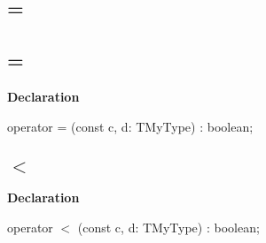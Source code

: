 \documentclass{report}
\newif\ifpdf
\begin{document}
\subsection*{\large{\textbf{=}}\normalsize\hspace{1ex}\hrulefill}
\else
\subsection*{=}
\fi
\label{ok_operator_test-=}
\index{=}
\begin{list}{}{
\setlength{\itemindent}{0cm}
\setlength{\listparindent}{0cm}
\setlength{\leftmargin}{\evensidemargin}
\addtolength{\leftmargin}{\tmplength}
\settowidth{\labelsep}{X}
\addtolength{\leftmargin}{\labelsep}
\setlength{\labelwidth}{\tmplength}
}
\item[\textbf{Declaration}\hfill]
\ifpdf
\begin{flushleft}
\fi
\begin{ttfamily}
operator = (const c, d: TMyType) : boolean;\end{ttfamily}

\ifpdf
\end{flushleft}
\fi

\end{list}
\ifpdf
\subsection*{\large{\textbf{{$<$}}}\normalsize\hspace{1ex}\hrulefill}
\else
\subsection*{{$<$}}
\fi
\label{ok_operator_test-<}
\index{{$<$}}
\begin{list}{}{
\setlength{\itemindent}{0cm}
\setlength{\listparindent}{0cm}
\setlength{\leftmargin}{\evensidemargin}
\addtolength{\leftmargin}{\tmplength}
\settowidth{\labelsep}{X}
\addtolength{\leftmargin}{\labelsep}
\setlength{\labelwidth}{\tmplength}
}
\item[\textbf{Declaration}\hfill]
\ifpdf
\begin{flushleft}
\fi
\begin{ttfamily}
operator {$<$} (const c, d: TMyType) : boolean;\end{ttfamily}

\ifpdf
\end{flushleft}
\fi

\end{list}
\ifpdf
\end{document}
